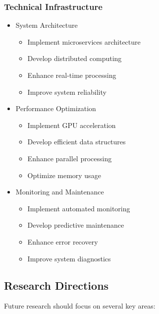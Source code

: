 \documentclass[conference]{IEEEtran}
\begin{document}
\subsubsection{Technical Infrastructure}
\begin{itemize}
    \item System Architecture
    \begin{itemize}
        \item Implement microservices architecture
        \item Develop distributed computing
        \item Enhance real-time processing
        \item Improve system reliability
    \end{itemize}
    
    \item Performance Optimization
    \begin{itemize}
        \item Implement GPU acceleration
        \item Develop efficient data structures
        \item Enhance parallel processing
        \item Optimize memory usage
    \end{itemize}
    
    \item Monitoring and Maintenance
    \begin{itemize}
        \item Implement automated monitoring
        \item Develop predictive maintenance
        \item Enhance error recovery
        \item Improve system diagnostics
    \end{itemize}
\end{itemize}

\subsection{Research Directions}
Future research should focus on several key areas:
\end{document}
